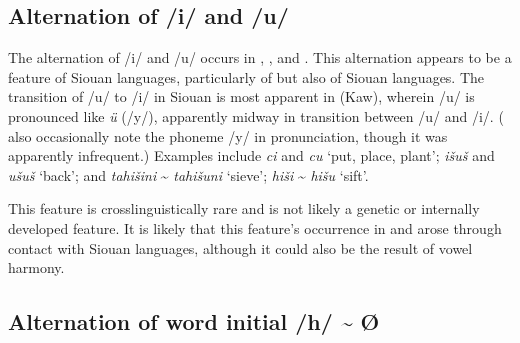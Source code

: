 \documentclass[output=paper]{LSP/langsci}
\begin{document}
\subsection{Alternation of /i/ and /u/}
	
The alternation of /i/ and /u/ occurs in , , and . This alternation appears to be a feature of Siouan languages, particularly of  but also of  Siouan languages. The transition of /u/ to /i/ in Siouan is most apparent in  (Kaw), wherein /u/ is pronounced like  \emph{ü} (/y/), apparently midway in transition between /u/ and /i/. (\citealt{DorseySwanton1912} also occasionally note the phoneme /y/ in  pronunciation, though it was apparently infrequent.) Examples include  \emph{ci} and \emph{cu} `put, place, plant';  \emph{išuš} and \emph{ušuš} `back'; and  \emph{tahišini} \textasciitilde{} \emph{tahišuni} `sieve';  \emph{hiši} \textasciitilde{} \emph{hišu} `sift'.

This feature is crosslinguistically rare and is not likely a genetic or internally developed feature. It is likely that this feature’s occurrence in  and  arose through contact with Siouan languages, although it could also be the result of vowel harmony. 

\subsection{Alternation of word initial /h/ \textasciitilde{} Ø}
\end{document}
